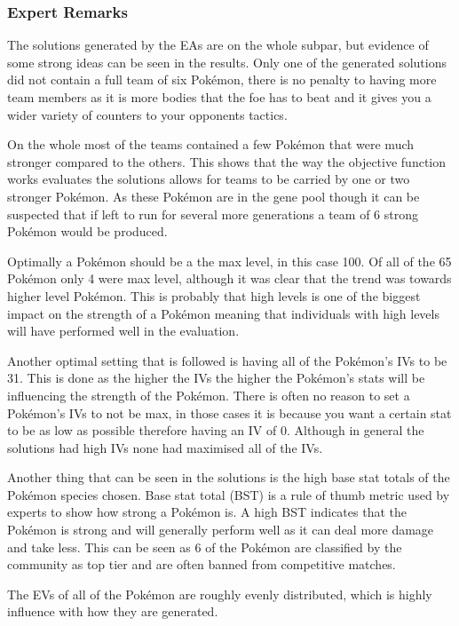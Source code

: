 \documentclass[a4paper]{article}
\newcommand{\Pokemon}{Pok\'{e}mon}
\begin{document}
\subsubsection{Expert Remarks}
The solutions generated by the EAs are on the whole subpar, but evidence of some strong ideas can be seen in the results.
Only one of the generated solutions did not contain a full team of six \Pokemon{}, there is no penalty to having more team members as it is more bodies that the foe has to beat and it gives you a wider variety of counters to your opponents tactics.
\par
On the whole most of the teams contained a few \Pokemon{} that were much stronger compared to the others.
This shows that the way the objective function works evaluates the solutions allows for teams to be carried by one or two stronger \Pokemon{}.
As these \Pokemon{} are in the gene pool though it can be suspected that if left to run for several more generations a team of 6 strong \Pokemon{} would be produced.
\par
Optimally a \Pokemon{} should be a the max level, in this case 100.
Of all of the 65 \Pokemon{} only 4 were max level, although it was clear that the trend was towards higher level \Pokemon{}.
This is probably that high levels is one of the biggest impact on the strength of a \Pokemon{} meaning that individuals with high levels will have performed well in the evaluation.
\par
Another optimal setting that is followed is having all of the \Pokemon{}'s IVs to be 31.
This is done as the higher the IVs the higher the \Pokemon{}'s stats will be influencing the strength of the \Pokemon{}.
There is often no reason to set a \Pokemon{}'s IVs to not be max, in those cases it is because you want a certain stat to be as low as possible therefore having an IV of 0.
Although in general the solutions had high IVs none had maximised all of the IVs.
\par
Another thing that can be seen in the solutions is the high base stat totals of the \Pokemon{} species chosen.
Base stat total (BST) is a rule of thumb metric used by experts to show how strong a \Pokemon{} is.
A high BST indicates that the \Pokemon{} is strong and will generally perform well as it can deal more damage and take less.
This can be seen as 6 of the \Pokemon{} are classified by the community as top tier and are often banned from competitive matches.
\par
The EVs of all of the \Pokemon{} are roughly evenly distributed, which is highly influence with how they are generated.
\end{document}
